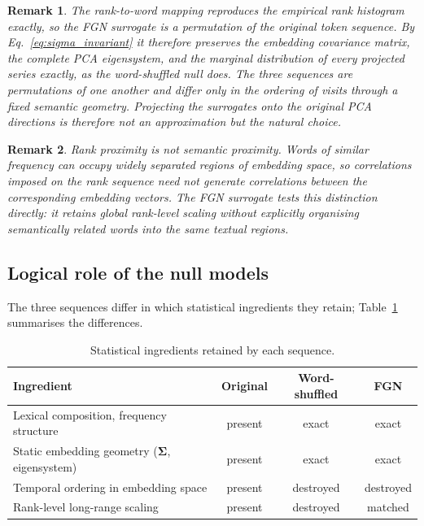 \documentclass[preprint]{elsarticle}
\newtheorem{remark}{Remark}
\newcommand{\Sig}{\boldsymbol{\Sigma}}
\begin{document}
\begin{remark}
\label{rem:fgn_cov}
  The rank-to-word mapping reproduces the empirical rank histogram
  exactly, so the FGN surrogate is a permutation of the original token
  sequence. By Eq.~\eqref{eq:sigma_invariant} it therefore preserves the
  embedding covariance matrix, the complete PCA eigensystem, and the
  marginal distribution of every projected series exactly, as the
  word-shuffled null does. The three sequences are permutations of one
  another and differ only in the ordering of visits through a fixed
  semantic geometry. Projecting the surrogates onto the original PCA
  directions is therefore not an approximation but the natural choice.
\end{remark}

\begin{remark}
\label{rem:fgn_entropy}
  Rank proximity is not semantic proximity.
  Words of similar frequency can occupy widely separated regions of
  embedding space, so correlations imposed on the rank sequence need
  not generate correlations between the corresponding embedding
  vectors.
  The FGN surrogate tests this distinction directly: it retains global
  rank-level scaling without explicitly organising semantically related
  words into the same textual regions.
\end{remark}

\subsection{Logical role of the null models}
\label{sec:taxonomy}

The three sequences differ in which statistical ingredients they retain;
Table~\ref{tab:null_taxonomy} summarises the differences.

\begin{table}[tbp]
\centering
\caption{Statistical ingredients retained by each sequence.}

\label{tab:null_taxonomy}
\small
\begin{tabular}{lccc}
\toprule
Ingredient & Original & Word-shuffled & FGN \\
\midrule
Lexical composition, frequency structure & present & exact & exact \\
Static embedding geometry ($\Sig$, eigensystem) & present & exact & exact \\
Temporal ordering in embedding space & present & destroyed & destroyed \\
Rank-level long-range scaling & present & destroyed & matched \\
\bottomrule
\end{tabular}
\end{table}
\end{document}
